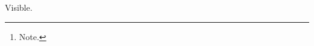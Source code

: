 \documentclass[paper=A4]{ropas-poster}
\subtitle{Wrong\footnote{Note.}}
\begin{document}
Visible.
\end{document}
